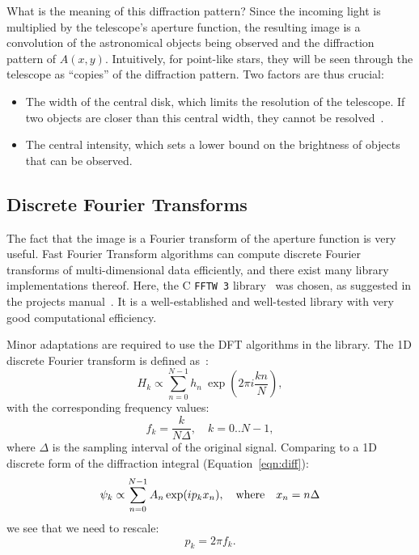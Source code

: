 \documentclass{article}
\newcommand{\CC}{{C\nolinebreak[4]\hspace{-.05em}\raisebox{.3ex}{\scriptsize\bf ++}}}
\begin{document}
What is the meaning of this diffraction pattern? Since the incoming light is multiplied by the telescope's aperture function, the resulting image is a convolution of the astronomical objects being observed and the diffraction pattern of $A(x, y)$. Intuitively, for point-like stars, they will be seen through the telescope as ``copies'' of the diffraction pattern. Two factors are thus crucial:
\begin{itemize}
    \item The width of the central disk, which limits the resolution of the telescope. If two objects are closer than this central width, they cannot be resolved~\cite[Section~10.2.6]{hecht}.
    \item The central intensity, which sets a lower bound on the brightness of objects that can be observed.
\end{itemize}

\subsection{Discrete Fourier Transforms}\label{sec:analysis:dft}
The fact that the image is a Fourier transform of the aperture function is very useful. Fast Fourier Transform algorithms can compute discrete Fourier transforms of multi-dimensional data efficiently, and there exist many library implementations thereof. Here, the \CC{} \texttt{FFTW 3} library~\cite{fftw} was chosen, as suggested in the projects manual~\cite{manual}. It is a well-established and well-tested library with very good computational efficiency.

Minor adaptations are required to use the DFT algorithms in the library. The 1D discrete Fourier transform is defined as~\cite[Chapter 12.1]{NumRecipes}:
\begin{equation}
    H_k \propto \sum_{n=0}^{N-1} h_n\ \exp( 2\pi{}i \frac{kn}{N} ),
\end{equation}
with the corresponding frequency values:
\begin{equation}\label{eqn:fk}
    f_k = \frac{k}{N \Delta},\quad k = 0..N-1,
\end{equation}
where $\Delta$ is the sampling interval of the original signal. Comparing to a 1D discrete form of the diffraction integral (Equation~\ref{eqn:diff}):
\begin{equation}
    \psi_k \propto \sum_{n=0}^{N-1} A_n \exp( i p_k x_n ), \qq{where} x_n = n \Delta
\end{equation}
we see that we need to rescale:
\begin{equation}
    p_k = 2\pi f_k.
\end{equation}
\end{document}
